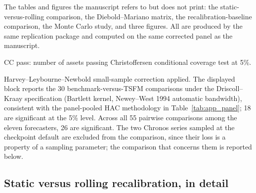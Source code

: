 \documentclass[preprint,11pt,authoryear]{elsarticle}
\newcommand{\1}{\boldsymbol{1}}
\newcommand{\qVstat}{\hat{q}_{\scriptscriptstyle\mathrm{V}}^{\,\mathrm{stat}}}
\newcommand{\qVroll}{\hat{q}_{{\scriptscriptstyle\mathrm{V}},t}^{\,\mathrm{roll}}}
\begin{document}
The tables and figures the manuscript refers to but does not print: the
static-versus-rolling comparison, the Diebold--Mariano matrix, the
recalibration-baseline comparison, the Monte Carlo study, and three figures.
All are produced by the same replication package and computed on the same
corrected panel as the manuscript.

\begin{table}[htbp]
	\centering
	\caption{Static ($\qVstat$, 70/30 split) versus rolling ($\qVroll$, 250-day window) conformal correction ($\alpha = 0.01$, mean across 24 assets).}
	\label{tab:rolling_vs_static}
	\footnotesize
	
	\begin{minipage}{\linewidth}\scriptsize
		\smallskip
		CC pass: number of assets passing Christoffersen conditional coverage test at 5\%.
	\end{minipage}
\end{table}

\begin{table}[H]
	\centering
	\caption{Diebold--Mariano test $p$-values for Quantile Score differences (corrected forecasts, $\alpha = 0.01$, Driscoll--Kraay panel HAC, 24 assets). Values below 0.05 indicate a significant difference in Quantile Score between the row and column models.}
	\label{tab:dm}
	\footnotesize
	
	\begin{minipage}{\linewidth}\footnotesize
		\smallskip
		Harvey--Leybourne--Newbold small-sample correction applied. The displayed block reports the 30 benchmark-versus-TSFM comparisons under the Driscoll--Kraay specification (Bartlett kernel, Newey--West 1994 automatic bandwidth), consistent with the panel-pooled HAC methodology in Table~\ref{tab:app_panel}; 18 are significant at the 5\% level. Across all 55 pairwise comparisons among the eleven forecasters, 26 are significant. The two Chronos series sampled at the checkpoint default are excluded from the comparison, since their loss is a property of a sampling parameter; the comparison that concerns them is reported below.
	\end{minipage}
\end{table}





\subsection{Static versus rolling recalibration, in detail}
\label{app:static_vs_rolling}
\end{document}
